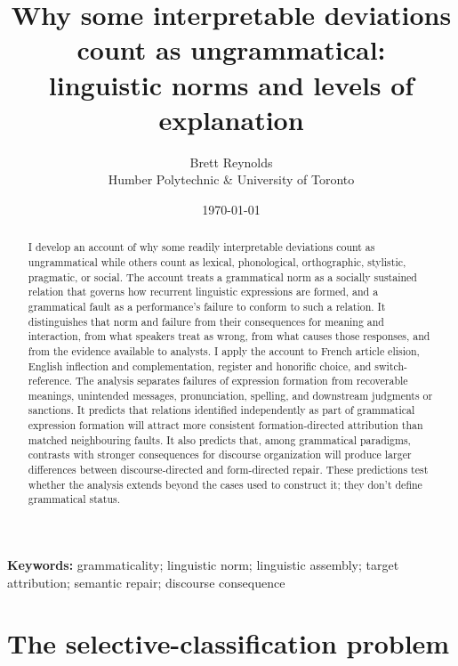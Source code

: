 \documentclass[12pt,letterpaper]{article}
\title{Why some interpretable deviations count as ungrammatical:\\linguistic norms and levels of explanation}
\author{}
\date{}
\author{Brett Reynolds \orcidlink{0000-0003-0073-7195}\\Humber Polytechnic \& University of Toronto}
\date{\today}
\begin{document}
\maketitle

\begin{abstract}
I develop an account of why some readily interpretable deviations count as
ungrammatical while others count as lexical, phonological, orthographic,
stylistic, pragmatic, or social. The account treats a grammatical norm as a
socially sustained relation that governs how recurrent linguistic expressions
are formed, and a grammatical fault as a performance's failure to conform to such
a relation. It distinguishes that norm and failure from their consequences for
meaning and interaction, from what speakers treat as wrong, from what causes
those responses, and from the evidence available to analysts. I apply the account
to French article elision, English inflection and complementation, register and
honorific choice, and switch-reference. The analysis separates failures of
expression formation from recoverable meanings, unintended messages,
pronunciation, spelling, and downstream judgments or sanctions. It predicts that
relations identified independently as part of grammatical expression formation
will attract more consistent formation-directed attribution than matched
neighbouring faults. It also predicts that, among grammatical paradigms,
contrasts with stronger consequences for discourse organization will produce
larger differences between discourse-directed and form-directed repair. These
predictions test whether the analysis extends beyond the cases used to construct
it; they don't define grammatical status.
\end{abstract}

\smallskip
\noindent \textbf{Keywords:} grammaticality; linguistic norm; linguistic assembly; target attribution; semantic repair; discourse consequence

\medskip


\section{The selective-classification problem}
\label{sec:problem}
\end{document}
